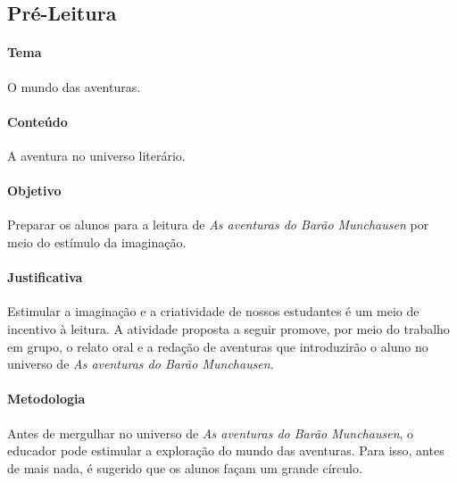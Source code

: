 \documentclass[11pt]{extarticle}
\begin{document}
\subsection{Pré-Leitura}


\paragraph{Tema} O mundo das aventuras.  

\paragraph{Conteúdo} A aventura no universo literário. 

\paragraph{Objetivo} Preparar os alunos para a leitura de \textit{As aventuras do Barão Munchausen} por meio do estímulo da imaginação.

\paragraph{Justificativa} Estimular a imaginação e a criatividade de nossos estudantes é um meio de incentivo à leitura. A atividade proposta a seguir promove, por meio do trabalho em grupo, o relato oral e a redação de aventuras que introduzirão o aluno no universo de \textit{As aventuras do Barão Munchausen}.    

\paragraph{Metodologia} Antes de mergulhar no universo de \textit{As aventuras do Barão Munchausen}, o educador pode estimular a exploração do mundo das aventuras. Para isso, antes de mais nada, é sugerido que os alunos façam um grande círculo. 
\end{document}
